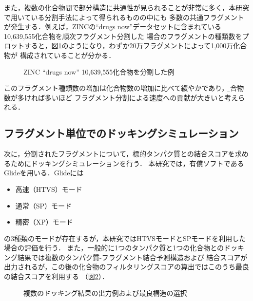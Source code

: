また，複数の化合物間で部分構造に共通性が見られることが非常に多く，本研究で用いている分割手法によって得られるものの中にも
多数の共通フラグメントが発生する．例えば，ZINCの``drugs now''データセットに含まれている10,639,555化合物を順次フラグメント分割した
場合のフラグメントの種類数をプロットすると，図\ref{fig:decomposition_amount}のようになり，わずか20万フラグメントによって1,000万化合物が
構成されていることが分かる．
\begin{figure}[htp]
 \begin{center}
  \caption{ZINC ``drugs now'' 10,639,555化合物を分割した例}
  \label{fig:decomposition_amount}
 \end{center}
\end{figure}
このフラグメント種類数の増加は化合物数の増加に比べて緩やかであり，\b{化合物数が多ければ多いほど
フラグメント分割による速度への貢献が大きい}と考えられる．

\subsection{フラグメント単位でのドッキングシミュレーション}
次に，分割されたフラグメントについて，標的タンパク質との結合スコアを求めるためにドッキングシミュレーションを行う．
本研究では，有償ソフトであるGlide\cite{Friesner2004}を用いる．Glideには
\begin{itemize}
\item 高速（HTVS）モード
\item 通常（SP）モード
\item 精密（XP）モード
\end{itemize}
の3種類のモードが存在するが，本研究ではHTVSモードとSPモードを利用した場合の評価を行う．
また，一般的に1つのタンパク質と1つの化合物とのドッキング結果では複数のタンパク質-フラグメント結合予測構造および
結合スコアが出力されるが，この後の化合物のフィルタリングスコアの算出ではこのうち最良の結合スコアを利用する
（図\ref{fig:fragment_result}）．

\begin{figure}[t]
\begin{minipage}{0.5\hsize}
 \begin{center}
 \end{center}
\end{minipage}
\begin{minipage}{0.5\hsize}
 \begin{center}
 \end{center}
\end{minipage}
 \caption{複数のドッキング結果の出力例および最良構造の選択}
 \label{fig:fragment_result}
\end{figure}

